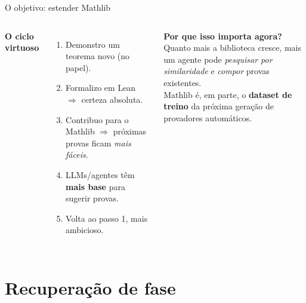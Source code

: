 \documentclass[10pt,aspectratio=169]{beamer}
\newcommand{\hl}[1]{{\color{accent}\textbf{#1}}}
\newcommand{\hlb}[1]{{\color{accent2}\textbf{#1}}}
\begin{document}
\begin{frame}{O objetivo: estender Mathlib}
  \begin{columns}[T,onlytextwidth]
    \textbf{O ciclo virtuoso}
    \begin{enumerate}
      \setlength{\itemsep}{0.4em}
      \item Demonstro um teorema novo (no papel).
      \pause
      \item Formalizo em Lean $\Rightarrow$ certeza absoluta.
      \pause
      \item Contribuo para o Mathlib $\Rightarrow$ próximas provas
            ficam \emph{mais fáceis}.
      \pause
      \item LLMs/agentes têm \hlb{mais base} para sugerir provas.
      \pause
      \item Volta ao passo 1, mais ambicioso.
    \end{enumerate}

    \begin{tcolorbox}[colback=bgpanel,colframe=accent,arc=2pt,boxrule=0.5pt,
                       left=8pt,right=8pt,top=6pt,bottom=6pt]
      \small\color{fgmain}
      \textbf{\color{accent}Por que isso importa agora?}\\[0.3em]
      Quanto mais a biblioteca cresce, mais um agente pode \emph{pesquisar
      por similaridade} e \emph{compor} provas existentes.\\[0.4em]
      Mathlib é, em parte, o \hl{dataset de treino} da próxima geração
      de provadores automáticos.
    \end{tcolorbox}
  \end{columns}
\end{frame}

\section{Recuperação de fase}
\end{document}
